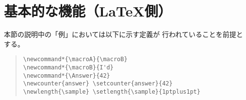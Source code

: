 \documentclass[a4paper]{ltjsarticle}
\begin{document}
\section{基本的な機能（{\LaTeX}側）}
\label{sec:basic-latex}

本節の説明中の「例」においては以下に示す定義が
行われていることを前提とする。

\begin{quote}\small\begin{verbatim}
\newcommand*{\macroA}{\macroB}
\newcommand*{\macroB}{I'd}
\newcommand*{\Answer}{42}
\newcounter{answer} \setcounter{answer}{42}
\newlength{\sample} \setlength{\sample}{1ptplus1pt}
\end{verbatim}\end{quote}
\end{document}
